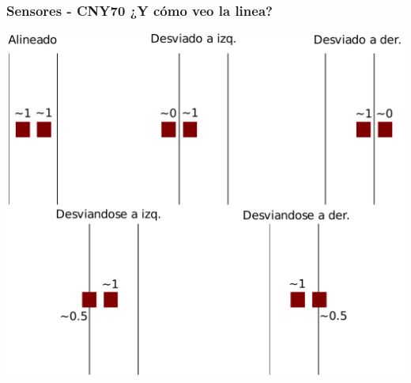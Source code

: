 \documentclass[compress]{beamer}
\begin{document}
\begin{frame}
\frametitle{Sensores - CNY70 ¿Y cómo veo la linea?}
\begin{center}
 \includegraphics[height=0.8\textheight]{./img/sensores_image.pdf}
\end{center}
\end{frame}
\end{document}
